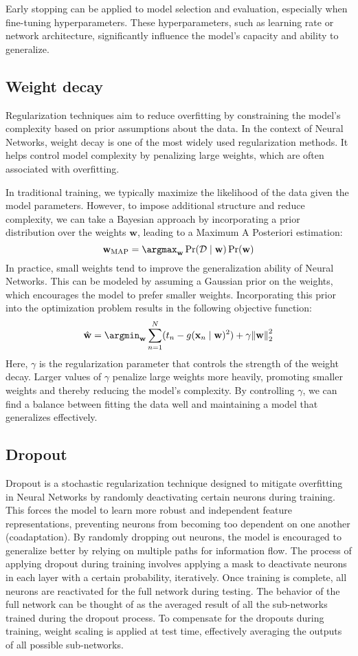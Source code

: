Early stopping can be applied to model selection and evaluation, especially when fine-tuning hyperparameters. 
These hyperparameters, such as learning rate or network architecture, significantly influence the model's capacity and ability to generalize.

\subsection{Weight decay}
Regularization techniques aim to reduce overfitting by constraining the model's complexity based on prior assumptions about the data. 
In the context of Neural Networks, weight decay is one of the most widely used regularization methods. It helps control model complexity by penalizing large weights, which are often associated with overfitting.

In traditional training, we typically maximize the likelihood of the data given the model parameters. 
However, to impose additional structure and reduce complexity, we can take a Bayesian approach by incorporating a prior distribution over the weights $\mathbf{w}$, leading to a Maximum A Posteriori estimation:
\[ \mathbf{w}_{\text{MAP}}=\argmax_{\mathbf{w}}\Pr(\mathcal{D}\mid\mathbf{w})\Pr(\mathbf{w})\]
\noindent In practice, small weights tend to improve the generalization ability of Neural Networks. 
This can be modeled by assuming a Gaussian prior on the weights, which encourages the model to prefer smaller weights. 
Incorporating this prior into the optimization problem results in the following objective function:
\[\hat{\mathbf{w}}=\argmin_{\mathbf{w}}\sum_{n=1}^N(t_n-g(\mathbf{x}_n\mid\mathbf{w})^2)+\gamma{\left\lVert \mathbf{w}\right\rVert}_2^2 \]
\noindent Here, $\gamma$ is the regularization parameter that controls the strength of the weight decay.
Larger values of $\gamma$ penalize large weights more heavily, promoting smaller weights and thereby reducing the model's complexity.
By controlling $\gamma$, we can find a balance between fitting the data well and maintaining a model that generalizes effectively. 

\subsection{Dropout}
Dropout is a stochastic regularization technique designed to mitigate overfitting in Neural Networks by randomly deactivating certain neurons during training. 
This forces the model to learn more robust and independent feature representations, preventing neurons from becoming too dependent on one another (coadaptation). 
By randomly dropping out neurons, the model is encouraged to generalize better by relying on multiple paths for information flow.
\noindent The process of applying dropout during training involves applying a mask to deactivate neurons in each layer with a certain probability, iteratively. 
Once training is complete, all neurons are reactivated for the full network during testing. 
The behavior of the full network can be thought of as the averaged result of all the sub-networks trained during the dropout process. 
To compensate for the dropouts during training, weight scaling is applied at test time, effectively averaging the outputs of all possible sub-networks.